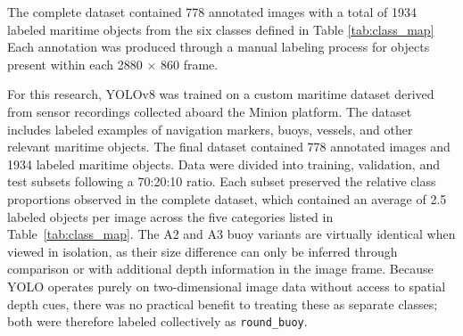 \documentclass{erauthesis}
\begin{document}
The complete dataset contained 778 annotated images with a total of 1934 labeled maritime objects from the six classes defined in Table \ref{tab:class_map} 
Each annotation was produced through a manual labeling process for objects present within each 2880 $\times$ 860 frame. 

For this research, YOLOv8 was trained on a custom maritime dataset derived from sensor recordings collected aboard the Minion platform.
The dataset includes labeled examples of navigation markers, buoys, vessels, and other relevant maritime objects.
The final dataset contained 778 annotated images and 1934 labeled maritime objects. 
Data were divided into training, validation, and test subsets following a 70:20:10 ratio.
Each subset preserved the relative class proportions observed in the complete dataset, which contained an average of 2.5 labeled objects per image across the five categories listed in Table~\ref{tab:class_map}.
The A2 and A3 buoy variants are virtually identical when viewed in isolation, as their size difference can only be inferred through comparison or with additional depth information in the image frame. 
Because YOLO operates purely on two-dimensional image data without access to spatial depth cues, there was no practical benefit to treating these as separate classes; both were therefore labeled collectively as \texttt{round\_buoy}.

\end{document}
